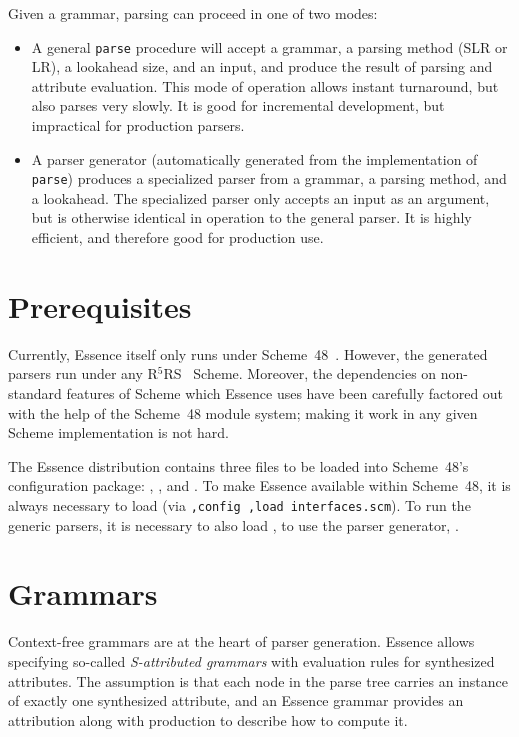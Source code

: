 \documentclass{article}
\newcommand{\codefont}[1]{\texttt{#1}}
\begin{document}
Given a grammar, parsing can proceed in one of two modes:
%
\begin{itemize}
\item A general \codefont{parse} procedure will accept a grammar, a
  parsing method (SLR or LR), a lookahead size, and an input, and
  produce the result of parsing and attribute evaluation.  This mode
  of operation allows instant turnaround, but also parses very
  slowly.  It is good for incremental development, but impractical for
  production parsers.
\item A parser generator (automatically generated from the
  implementation of \codefont{parse}) produces a specialized parser
  from a grammar, a parsing method, and a lookahead.  The specialized
  parser only accepts an input as an argument, but is otherwise
  identical in operation to the general parser.  It is highly
  efficient, and therefore good for production use.
\end{itemize}

\section{Prerequisites}
\label{sec:preliminaries}

Currently, Essence itself only runs under
Scheme~48~\cite{KelseyRees1995}.  However, the generated parsers run
under any R$^5$RS~\cite{KelseyClingerRees1998} Scheme.  Moreover, the
dependencies on non-standard features of Scheme which Essence uses
have been carefully factored out with the help of the Scheme~48 module
system; making it work in any given Scheme implementation is not hard.

The Essence distribution contains three files to be loaded into
Scheme~48's configuration package: ,
, and .  To
make Essence available within Scheme~48, it is always necessary to
load  (via \codefont{,config ,load
  interfaces.scm}).  To run the generic parsers, it is necessary to
also load , to use the parser generator,
.

\section{Grammars}
\label{sec:grammars}

Context-free grammars are at the heart of parser generation.  Essence
allows specifying so-called \emph{S-attributed grammars} with
evaluation rules for synthesized attributes.  The assumption is that
each node in the parse tree carries an instance of exactly one
synthesized attribute, and an Essence grammar provides an attribution
along with production to describe how to compute it.
\end{document}
